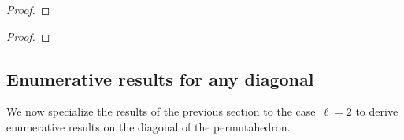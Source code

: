 \begin{proof}
\end{proof}

\begin{theorem}
\end{theorem}

\begin{proof}
\end{proof}

\subsection{Enumerative results for any diagonal} 
\label{s:facets}

We now specialize the results of the previous section to the case~$\ell = 2$ to derive enumerative results on the diagonal of the permutahedron.

